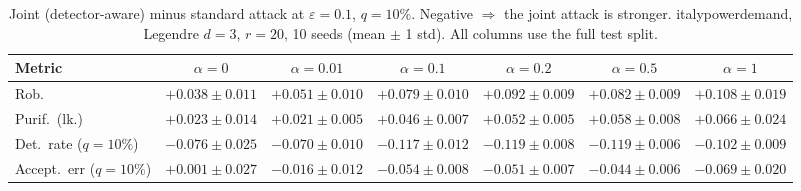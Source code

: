 \begin{table}[htbp]
  \centering
  \small
  \begin{tabular}{@{}lcccccc@{}}
    \toprule
    Metric & $\alpha{=}0$ & $\alpha{=}0.01$ & $\alpha{=}0.1$ & $\alpha{=}0.2$ & $\alpha{=}0.5$ & $\alpha{=}1$ \\
    \midrule
    Rob. & $+0.038 \pm 0.011$ & $+0.051 \pm 0.010$ & $+0.079 \pm 0.010$ & $+0.092 \pm 0.009$ & $+0.082 \pm 0.009$ & $+0.108 \pm 0.019$ \\
    Purif.\ (lk.) & $+0.023 \pm 0.014$ & $+0.021 \pm 0.005$ & $+0.046 \pm 0.007$ & $+0.052 \pm 0.005$ & $+0.058 \pm 0.008$ & $+0.066 \pm 0.024$ \\
    Det.\ rate ($q{=}10\%$) & $-0.076 \pm 0.025$ & $-0.070 \pm 0.010$ & $-0.117 \pm 0.012$ & $-0.119 \pm 0.008$ & $-0.119 \pm 0.006$ & $-0.102 \pm 0.009$ \\
    Accept.\ err ($q{=}10\%$) & $+0.001 \pm 0.027$ & $-0.016 \pm 0.012$ & $-0.054 \pm 0.008$ & $-0.051 \pm 0.007$ & $-0.044 \pm 0.006$ & $-0.069 \pm 0.020$ \\
    \bottomrule
  \end{tabular}
  \caption{Joint (detector-aware) minus standard attack at $\varepsilon=0.1$, $q{=}10\%$. Negative $\Rightarrow$ the joint attack is stronger. italypowerdemand, Legendre $d{=}3$, $r{=}20$, 10 seeds (mean $\pm$ 1 std). All columns use the full test split.}
  \label{tab:italypowerdemand_joint_r20_eps0.1}
\end{table}
